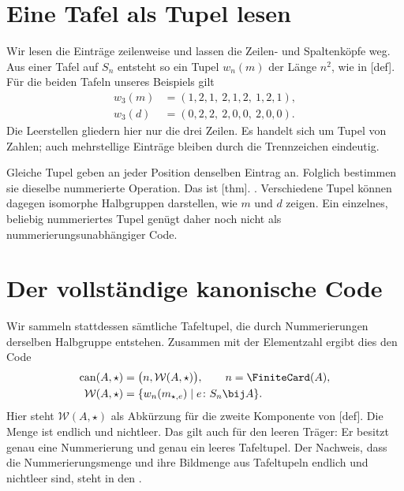 \section*{Eine Tafel als Tupel lesen}

Wir lesen die Einträge zeilenweise und lassen die Zeilen- und
Spaltenköpfe weg. Aus einer Tafel auf \(S_n\) entsteht so ein Tupel
\(w_n(m)\) der Länge \(n^2\), wie in
[def]. Für die beiden
Tafeln unseres Beispiels gilt
\[
\begin{aligned}
  w_3(m)&=(1,2,1,\ 2,1,2,\ 1,2,1),\\
  w_3(d)&=(0,2,2,\ 2,0,0,\ 2,0,0).
\end{aligned}
\]
Die Leerstellen gliedern hier nur die drei Zeilen. Es handelt sich
um Tupel von Zahlen; auch mehrstellige Einträge bleiben durch die
Trennzeichen eindeutig.

Gleiche Tupel geben an jeder Position denselben Eintrag an.
Folglich bestimmen sie dieselbe nummerierte Operation. Das ist
[thm].
.
Verschiedene Tupel können dagegen isomorphe Halbgruppen darstellen,
wie \(m\) und \(d\) zeigen. Ein einzelnes, beliebig nummeriertes
Tupel genügt daher noch nicht als nummerierungsunabhängiger Code.

\section*{Der vollständige kanonische Code}

Wir sammeln stattdessen sämtliche Tafeltupel, die durch
Nummerierungen derselben Halbgruppe entstehen. Zusammen mit der
Elementzahl ergibt dies den Code
\[
\begin{aligned}
  \operatorname{can}(A,\star)
   &=\bigl(n,\mathcal W(A,\star)\bigr),
   \qquad n=\FiniteCard(A),\\
  \mathcal W(A,\star)
   &=\{w_n(m_{\star,e})\mid e\colon S_n\bij A\}.
\end{aligned}
\]
Hier steht \(\mathcal W(A,\star)\) als Abkürzung für die zweite
Komponente von
[def]. Die
Menge ist endlich und nichtleer. Das gilt auch für den leeren
Träger: Er besitzt genau eine Nummerierung und genau ein leeres
Tafeltupel. Der Nachweis, dass die Nummerierungsmenge und ihre
Bildmenge aus Tafeltupeln endlich und nichtleer sind, steht in den
.

